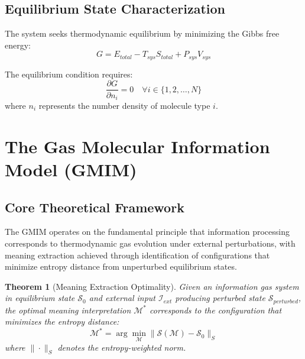 \documentclass[11pt,a4paper]{article}
\newtheorem{theorem}{Theorem}[section]
\begin{document}
\subsection{Equilibrium State Characterization}

The system seeks thermodynamic equilibrium by minimizing the Gibbs free energy:
\begin{equation}
G = E_{total} - T_{sys} S_{total} + P_{sys} V_{sys}
\end{equation}

The equilibrium condition requires:
\begin{equation}
\frac{\partial G}{\partial n_i} = 0 \quad \forall i \in \{1, 2, \ldots, N\}
\end{equation}
where $n_i$ represents the number density of molecule type $i$.

\section{The Gas Molecular Information Model (GMIM)}

\subsection{Core Theoretical Framework}

The GMIM operates on the fundamental principle that information processing corresponds to thermodynamic gas evolution under external perturbations, with meaning extraction achieved through identification of configurations that minimize entropy distance from unperturbed equilibrium states.

\begin{theorem}[Meaning Extraction Optimality]
Given an information gas system in equilibrium state $\mathcal{S}_0$ and external input $\mathcal{I}_{ext}$ producing perturbed state $\mathcal{S}_{perturbed}$, the optimal meaning interpretation $\mathcal{M}^*$ corresponds to the configuration that minimizes the entropy distance:
\begin{equation}
\mathcal{M}^* = \arg\min_{\mathcal{M}} \|\mathcal{S}(\mathcal{M}) - \mathcal{S}_0\|_S
\end{equation}
where $\|\cdot\|_S$ denotes the entropy-weighted norm.
\end{theorem}
\end{document}

